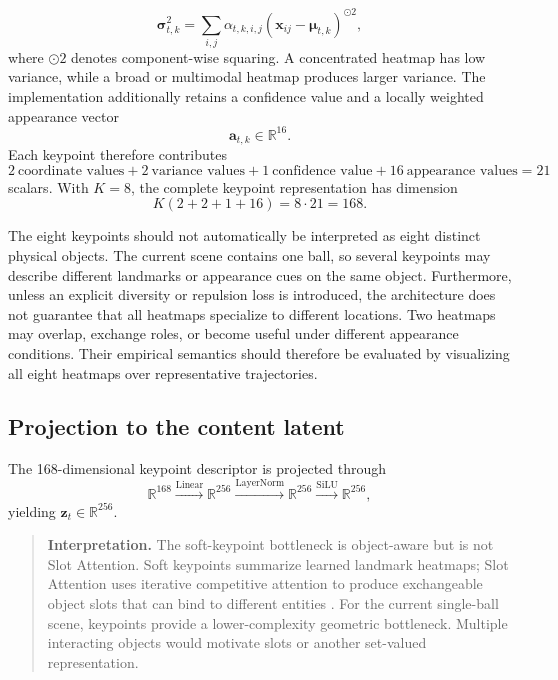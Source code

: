 \documentclass[11pt,a4paper]{article}
\newcommand{\R}{\mathbb{R}}\newcommand{\norm}[1]{\left\lVert #1\right\rVert}\newcommand{\E}{\mathbb{E}}\newcommand{\dt}{\Delta t}
\begin{document}
\begin{equation} 
	\boldsymbol{\sigma}_{t,k}^{2} = \sum_{i,j} \alpha_{t,k,i,j} \left( \mathbf x_{ij}-\boldsymbol{\mu}_{t,k} \right)^{\odot2}, \label{eq:keypoint-variance} 
\end{equation} where $\odot2$ denotes component-wise squaring. A concentrated heatmap has low variance, while a broad or multimodal heatmap produces larger variance. The implementation additionally retains a confidence value and a locally weighted appearance vector 
\begin{equation} 
	\mathbf a_{t,k}\in\mathbb{R}^{16}. 
\end{equation} 
Each keypoint therefore contributes 
\begin{equation} 
	2\ \text{coordinate values} + 2\ \text{variance values} + 1\ \text{confidence value} + 16\ \text{appearance values} = 21 
\end{equation} scalars. With $K=8$, the complete keypoint representation has dimension 
\begin{equation} 
	K\left(2+2+1+16\right) = 8\cdot21 = 168.
\end{equation} 

The eight keypoints should not automatically be interpreted as eight distinct physical objects. The current scene contains one ball, so several keypoints may describe different landmarks or appearance cues on the same object. Furthermore, unless an explicit diversity or repulsion loss is introduced, the architecture does not guarantee that all heatmaps specialize to different locations. Two heatmaps may overlap, exchange roles, or become useful under different appearance conditions. Their empirical semantics should therefore be evaluated by visualizing all eight heatmaps over representative trajectories.

\subsection{Projection to the content latent}
The 168-dimensional keypoint descriptor is projected through
\begin{equation}
\R^{168}\xrightarrow{\mathrm{Linear}}\R^{256}
\xrightarrow{\mathrm{LayerNorm}}\R^{256}
\xrightarrow{\mathrm{SiLU}}\R^{256},
\end{equation}
yielding $\bm z_t\in\R^{256}$.

\begin{quote}\textbf{Interpretation.} 
The soft-keypoint bottleneck is object-aware but is not Slot Attention. Soft keypoints summarize learned landmark heatmaps; Slot Attention uses iterative competitive attention to produce exchangeable object slots that can bind to different entities \cite{locatello2020slot}. For the current single-ball scene, keypoints provide a lower-complexity geometric bottleneck. Multiple interacting objects would motivate slots or another set-valued representation.
\end{quote}
\end{document}
